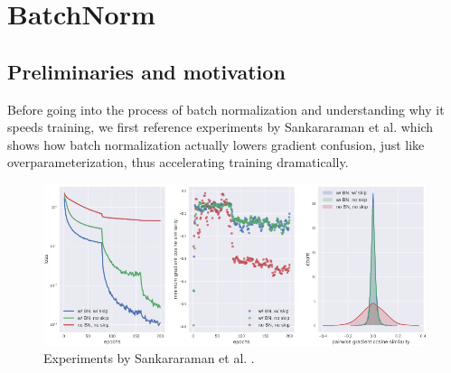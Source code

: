 \documentclass{article}
\begin{document}
\pagebreak
\section{BatchNorm}
\label{label:BatchNorm}

\subsection{Preliminaries and motivation}
Before going into the process of batch normalization and understanding why it speeds training, we first reference experiments by Sankararaman et al. \cite{gradient_confusion} which shows how batch normalization actually lowers gradient confusion, just like overparameterization, thus accelerating training dramatically.

\begin{figure}[h]
	\centering
    \includegraphics[width=\textwidth]{pics/batchNorm/batchnorm_grad_conf.png}
	\caption{Experiments by Sankararaman et al. \cite{gradient_confusion}. }
	\label{fig:batchnorm}
\end{figure}
\end{document}
